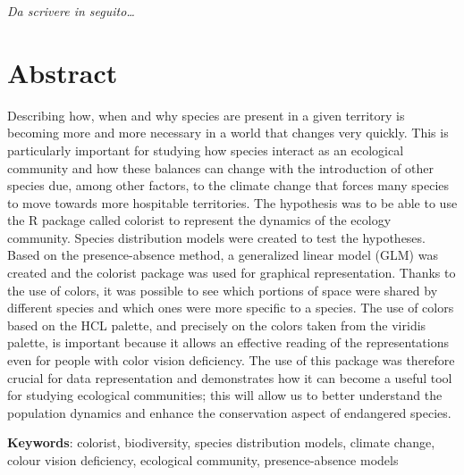 \documentclass[12pt,a4paper]{article}
\begin{document}
\begin{titlepage}                      
%
\thispagestyle{empty}                   %
\topmargin=6.5cm                        %
\raggedleft                             %
\large                                  %
                                       
\em                                     %
Da scrivere in seguito\ldots                      %
\newpage                                
\clearpage{\pagestyle{empty}\cleardoublepage}%
\end{titlepage}
\linespread{1.2} 
\newpage
\tableofcontents
\linespread{1.5} 
\newpage
\section{Abstract}
 Describing how, when and why species are present in a given territory is becoming more and more necessary in a world that changes very quickly.
This is particularly important for studying how species interact as an ecological community and how these balances can change with the introduction of other species due, among other factors, to the climate change that forces many species to move towards more hospitable territories.
The hypothesis was to be able to use the R package called colorist to represent the dynamics of the ecology community.
Species distribution models were created to test the hypotheses. Based on the presence-absence method, a generalized linear model (GLM) was created and the colorist package was used for graphical representation.
Thanks to the use of colors, it was possible to see which portions of space were shared by different species and which ones were more specific to a species.
The use of colors based on the HCL palette, and precisely on the colors taken from the viridis palette, is important because it allows an effective reading of the representations even for people with color vision deficiency.
The use of this package was therefore crucial for data representation and demonstrates how it can become a useful tool for studying ecological communities; this will allow us to better understand the population dynamics and enhance the conservation aspect of endangered species.
 
 
\vspace{1cm}
\textbf{Keywords}: colorist, biodiversity, species distribution models, climate change, colour vision deficiency, ecological community, presence-absence models
\\
\end{document}
